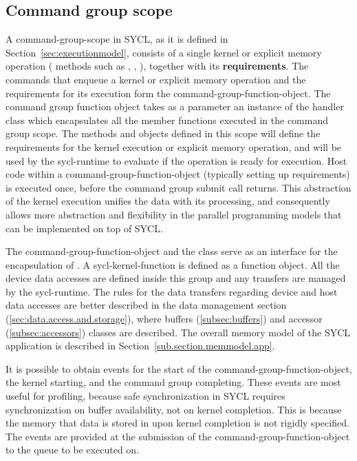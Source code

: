 \subsection{Command group scope}
\label{sec:command.group.scope}

A \gls{command-group-scope} in SYCL, as it is defined in 
Section~\ref{sec:executionmodel}, consists of a single kernel or explicit memory
operation ( methods such as , ,
), together with its \textbf{requirements}.
The commands that enqueue a kernel or explicit memory operation and the requirements
for its execution form the \gls{command-group-function-object}.
The command group
function object takes as a parameter an instance of the \gls{handler} class which 
encapsulates all the member functions executed in the command group scope. 
The methods and objects defined in this scope will define the requirements for the
kernel execution or explicit memory operation, and will be used by the \gls{sycl-runtime}
to evaluate if the operation is ready for execution.
Host code within a \gls{command-group-function-object} (typically setting up
requirements) is executed once, before the command group submit call returns.
This abstraction of the kernel
execution unifies the data with its processing, and consequently allows more
abstraction and flexibility in the parallel programming models that can be
implemented on top of SYCL.

The \gls{command-group-function-object} and the  class
serve as an interface for the encapsulation of .
A \gls{sycl-kernel-function} is defined as a function object. All the device data accesses are
defined inside this group and any transfers are managed by the \gls{sycl-runtime}. The
rules for the data transfers regarding device and
host data accesses are better described in the data management section
(\ref{sec:data.access.and.storage}), where buffers (\ref{subsec:buffers}) and
accessor (\ref{subsec:accessors}) classes are described.
The overall memory model of the SYCL application is described in
Section~\ref{sub.section.memmodel.app}.

It is possible to obtain events for the start of the \gls{command-group-function-object},
the kernel starting, and the command group completing.
These events are most useful for
profiling, because safe synchronization in SYCL requires synchronization on
buffer availability, not on kernel completion. This is because
the memory that data is stored in upon kernel
completion is not rigidly specified. The events are provided at the submission of the
\gls{command-group-function-object} to the queue to be executed on.

